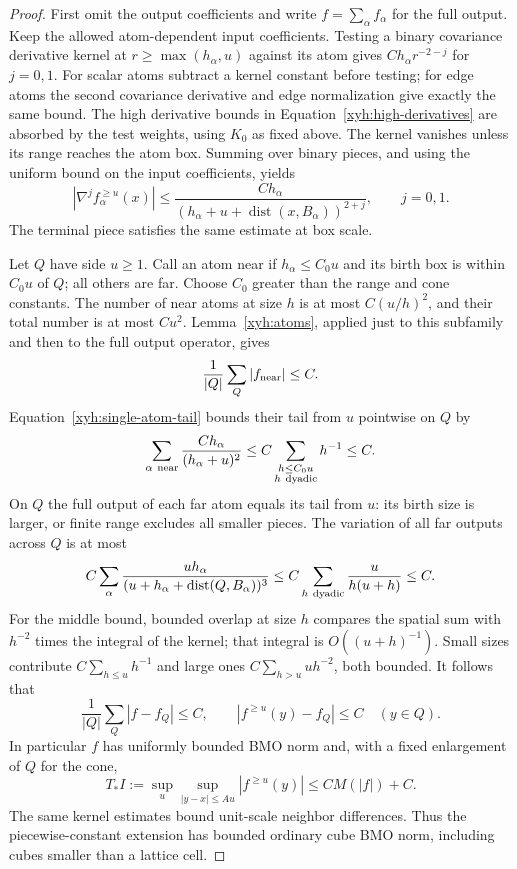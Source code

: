 \begin{proof}
First omit the output coefficients and write
$f=\sum_\alpha f_\alpha$ for the full output. Keep the allowed
atom-dependent input coefficients. Testing a binary covariance
derivative kernel at $r\ge\max(h_\alpha,u)$ against its atom gives
$Ch_\alpha r^{-2-j}$ for $j=0,1$. For scalar atoms subtract a kernel
constant before testing; for edge atoms the second covariance
derivative and edge normalization give exactly the same bound.
The high derivative bounds in Equation~\eqref{xyh:high-derivatives}
are absorbed by the test weights, using $K_0$ as fixed above.
The kernel vanishes unless its range reaches the atom box.
Summing over binary pieces, and using the uniform bound on the
input coefficients, yields
\begin{equation}\label{xyh:single-atom-tail}
 |\nabla^jf_\alpha^{\ge u}(x)|
 \le\frac{Ch_\alpha}
 {(h_\alpha+u+\operatorname{dist}(x,B_\alpha))^{2+j}},
 \qquad j=0,1.
\end{equation}
The terminal piece satisfies the same estimate at box scale.

Let $Q$ have side $u\ge1$. Call an atom near if $h_\alpha\le C_0u$
and its birth box is within $C_0u$ of $Q$; all others are far.
Choose $C_0$ greater than the range and cone constants. The number
of near atoms at size $h$ is at most $C(u/h)^2$, and their total
number is at most $Cu^2$. Lemma~\ref{xyh:atoms}, applied just to
this subfamily and then to the full output operator, gives
\[
 \frac1{|Q|}\sum_Q|f_{\rm near}|\le C.
\]
Equation~\eqref{xyh:single-atom-tail} bounds their tail from $u$
pointwise on $Q$ by
\[
 \sum_{\alpha\ {\rm near}}
       \frac{Ch_\alpha}{(h_\alpha+u)^2}
 \le C\sum_{\substack{h\le C_0u\\h\ {\rm dyadic}}}h^{-1}
 \le C.
\]
On $Q$ the full output of each far atom equals its tail from $u$:
its birth size is larger, or finite range excludes all smaller
pieces. The variation of all far outputs across $Q$ is at most
\[
 C\sum_\alpha
 \frac{u h_\alpha}
 {(u+h_\alpha+\operatorname{dist}(Q,B_\alpha))^3}
 \le C\sum_{h\ {\rm dyadic}}\frac{u}{h(u+h)}\le C.
\]
For the middle bound, bounded overlap at size $h$ compares the
spatial sum with $h^{-2}$ times the integral of the kernel;
that integral is $O((u+h)^{-1})$. Small sizes contribute
$C\sum_{h\le u}h^{-1}$ and large ones
$C\sum_{h>u}u h^{-2}$, both bounded. It follows that
\[
 \frac1{|Q|}\sum_Q|f-f_Q|\le C,
 \qquad |f^{\ge u}(y)-f_Q|\le C\quad(y\in Q).
\]
In particular $f$ has uniformly bounded BMO norm and, with a fixed
enlargement of $Q$ for the cone,
\[
 T_*I:=\sup_u\sup_{|y-x|\le Au}|f^{\ge u}(y)|
 \le C M(|f|)+C.
\]
The same kernel estimates bound unit-scale neighbor differences.
Thus the piecewise-constant extension has bounded ordinary cube
BMO norm, including cubes smaller than a lattice cell.


\end{proof}
